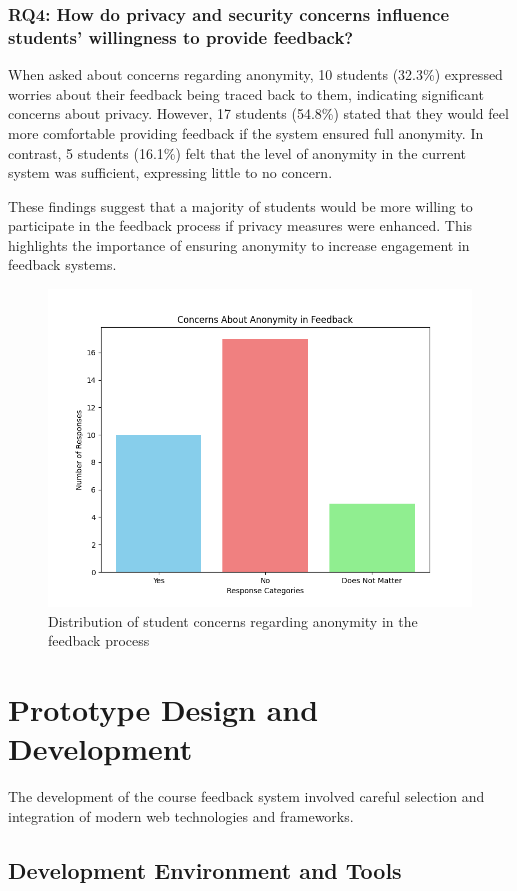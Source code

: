 \documentclass[conference]{IEEEtran}
\begin{document}
\subsubsection{RQ4: How do privacy and security concerns influence students' willingness to provide feedback?}
When asked about concerns regarding anonymity, 10 students (32.3\%) expressed worries about their feedback being traced back to them, indicating significant concerns about privacy. However, 17 students (54.8\%) stated that they would feel more comfortable providing feedback if the system ensured full anonymity. In contrast, 5 students (16.1\%) felt that the level of anonymity in the current system was sufficient, expressing little to no concern. 

These findings suggest that a majority of students would be more willing to participate in the feedback process if privacy measures were enhanced. This highlights the importance of ensuring anonymity to increase engagement in feedback systems.
\begin{figure}[htbp]
    \centering
    \includegraphics[width=0.8\linewidth]{feedback_anon.png} 
    \caption{Distribution of student concerns regarding anonymity in the feedback process}
    \label{fig:feedback_anon}
\end{figure}

\section{Prototype Design and Development}

The development of the course feedback system involved careful selection and integration of modern web technologies and frameworks.

\subsection{Development Environment and Tools}
\end{document}
